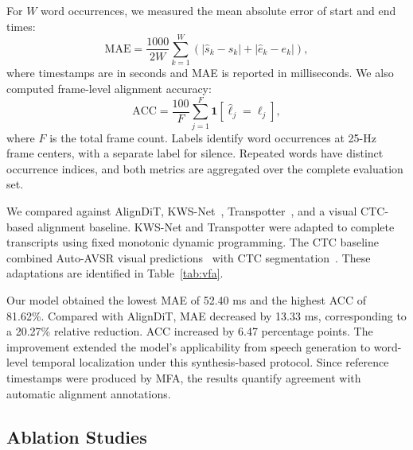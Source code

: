 For $W$ word occurrences, we measured the mean absolute error of start and end times:
\begin{equation}
    \mathrm{MAE}=
    \frac{1000}{2W}\sum_{k=1}^{W}
    \left(|\widehat s_k-s_k|+|\widehat e_k-e_k|\right),
    \label{eq:vfa_mae}
\end{equation}
where timestamps are in seconds and MAE is reported in milliseconds. We also computed frame-level alignment accuracy:
\begin{equation}
    \mathrm{ACC}=\frac{100}{F}
    \sum_{j=1}^{F}\mathbf{1}[\widehat\ell_j=\ell_j],
    \label{eq:vfa_accuracy}
\end{equation}
where $F$ is the total frame count. Labels identify word occurrences at 25-Hz frame centers, with a separate label for silence. Repeated words have distinct occurrence indices, and both metrics are aggregated over the complete evaluation set.

We compared against AlignDiT, KWS-Net~\cite{momeni2020kwsnet}, Transpotter~\cite{prajwal2021transpotter}, and a visual CTC-based alignment baseline. KWS-Net and Transpotter were adapted to complete transcripts using fixed monotonic dynamic programming. The CTC baseline combined Auto-AVSR visual predictions~\cite{ma2023autoavsr} with CTC segmentation~\cite{kurzinger2020ctcsegmentation}. These adaptations are identified in Table~\ref{tab:vfa}.



Our model obtained the lowest MAE of 52.40 ms and the highest ACC of 81.62\%. Compared with AlignDiT, MAE decreased by 13.33 ms, corresponding to a 20.27\% relative reduction. ACC increased by 6.47 percentage points. The improvement extended the model's applicability from speech generation to word-level temporal localization under this synthesis-based protocol. Since reference timestamps were produced by MFA, the results quantify agreement with automatic alignment annotations.

\subsection{Ablation Studies}
\label{sec:ablations}

